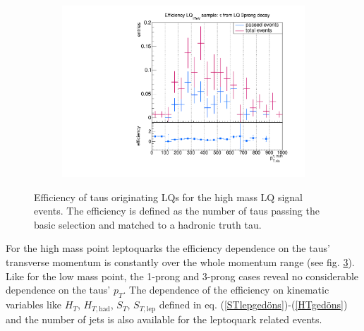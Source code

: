 \begin{figure}
\begin{subfigure}[t]{0.49\textwidth}
                \label{DividedfromLQ:signal:1prongLQ76}
                \end{subfigure}
                \begin{subfigure}[t]{0.49\textwidth}
                \includegraphics[width=\textwidth]{figures/plots/LQ76/Divided_fromLQ3prong.pdf}
                \label{DividedfromLQ:signal:3prongLQ76}
                \end{subfigure}            
\caption[Efficiency of taus originating LQs for the high mass LQ signal events.]{Efficiency of taus originating LQs for the high mass LQ signal events. The efficiency is defined as the number of taus passing the basic selection and matched to a hadronic truth tau.}
\label{DividedFromLQ:signal:LQ76}
\end{figure}
%
For the high mass point leptoquarks the efficiency dependence on the taus' transverse momentum is constantly over the whole momentum range (see fig. \ref{DividedFromLQ:signal:LQ76}). Like for the low mass point, the 1-prong and 3-prong cases reveal no considerable dependence on the taus' $p_T$. 
The dependence of the efficiency on kinematic variables like $H_T$, $H_{T,\text{had}}$, $S_T$, $S_{T,\text{lep}}$ defined in eq. (\ref{STlepgedöns})-(\ref{HTgedöns}) and the number of jets is also available for the leptoquark related events. \newline
